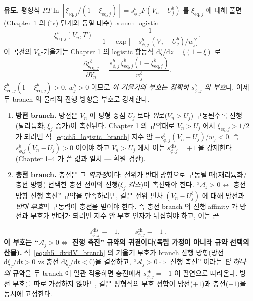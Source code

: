 \documentclass[11pt,a4paper]{article}
\newcommand{\dd}{\mathrm{d}}
\newcommand{\eq}{\mathrm{eq}}
\newcommand{\dis}{\mathrm{dis}}
\newcommand{\chg}{\mathrm{ch}}
\begin{document}
\textbf{유도.} 평형식 $RT\ln[\xi_{\eq,j}/(1-\xi_{\eq,j})]=s_{\phi,j}^b F(V_n-U_j^b)$ 를 $\xi_{\eq,j}$ 에 대해
풀면(Chapter 1 의 (iv) 단계와 동일 대수) branch logistic
\begin{equation}
\xi_{\eq,j}^b(V_n,T)=\frac{1}{1+\exp\!\big[-s_{\phi,j}^b\,(V_n-U_j^b)/w_j^b\big]}.
\label{eq:ch5_logistic_branch}
\end{equation}
이 곡선의 $V_n$-기울기는 Chapter 1 의 logistic 항등식 $\dd\xi/\dd z=\xi(1-\xi)$ 로
\begin{equation}
\frac{\partial\xi_{\eq,j}^b}{\partial V_n}=\frac{s_{\phi,j}^b\,\xi_{\eq,j}^b(1-\xi_{\eq,j}^b)}{w_j^b}.
\label{eq:ch5_dxidV_branch}
\end{equation}
$\xi_{\eq,j}^b(1-\xi_{\eq,j}^b)>0$, $w_j^b>0$ 이므로 \emph{이 기울기의 부호는 정확히 $s_{\phi,j}^b$ 의 부호}다.
이제 두 branch 의 물리적 진행 방향을 부호로 강제한다.
\begin{enumerate}[label=(\roman*),leftmargin=2.2em,itemsep=2pt]
\item \textbf{방전 branch.} 방전은 $V_n$ 이 평형 중심 $U_j$ 보다 \emph{위}로($V_n>U_j$) 구동될수록 진행(탈리튬화,
  $\xi_j$ 증가)이 촉진된다. Chapter 1 의 규약대로 $V_n>U_j$ 에서 $\xi_{\eq,j}>1/2$ 가 되려면 식~\eqref{eq:ch5_logistic_branch}
  지수 안 $-s_{\phi,j}^b(V_n-U_j)/w_j<0$, 즉 $s_{\phi,j}^b(V_n-U_j)>0$ 이어야 하고 $V_n>U_j$ 에서 이는
  $s_{\phi,j}^\dis=+1$ 을 강제한다(Chapter 1--4 가 쓴 값과 일치 — 환원 검산).
\item \textbf{충전 branch.} 충전은 그 \emph{역과정}이다: 전위가 반대 방향으로 구동될 때(재리튬화/충전 방향)
  선택한 충전 전이의 진행($\xi_j$ \emph{감소})이 촉진돼야 한다. ``$\mathcal A_j>0\Leftrightarrow$ 충전 방향
  진행 촉진'' 규약을 만족하려면, 같은 전위 편차 $(V_n-U_j^b)$ 에 대해 방전과 \emph{반대 부호}의 구동력이 충전을
  밀어야 한다. 즉 충전 branch 의 진행 affinity 가 방전과 부호가 반대가 되려면 지수 안 부호 인자가 뒤집혀야 하고,
  이는 곧
\end{enumerate}
\begin{equation}
\boxed{\;s_{\phi,j}^\dis=+1,\qquad s_{\phi,j}^\chg=-1\;.}
\label{eq:ch5_schg}
\end{equation}
\textbf{이 부호는 ``$\mathcal A_j>0\Leftrightarrow$ 진행 촉진'' 규약의 귀결이다(독립 가정이 아니라 규약 선택의 산물).} 식~\eqref{eq:ch5_dxidV_branch} 의 기울기 부호가 branch 진행
방향(방전 $\dd\xi_j/\dd t>0$ vs 충전 $\dd\xi_j/\dd t<0$)을 결정하고, ``$\mathcal A_j>0\Leftrightarrow$ 진행 촉진''
이라는 \emph{단 하나의} 규약을 두 branch 에 일관 적용하면 충전에서 $s_{\phi,j}^\chg=-1$ 이 필연으로 따라온다.
방전 부호를 따로 가정하지 않아도, 같은 평형식의 부호 정합이 방전($+1$)과 충전($-1$)을 동시에 고정한다.
\end{document}

